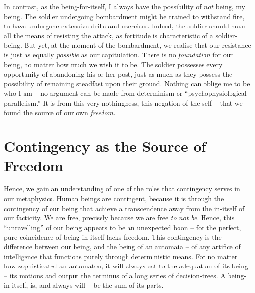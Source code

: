 In contrast, as the being-for-itself, I always have the possibility of \emph{not} being, my being. The soldier undergoing bombardment might be trained to withstand fire, to have undergone extensive drills and exercises. Indeed, the soldier should have all the means of resisting the attack, as fortitude is characteristic of a soldier-being. But yet, at the moment of the bombardment, we realise that our resistance is just as equally \emph{possible} as our capitulation. There is no \emph{foundation} for our being, no matter how much we wish it to be. The soldier possesses every opportunity of abandoning his or her post, just as much as they possess the possibility of remaining steadfast upon their ground.  Nothing can oblige me to be who I am -- no argument can be made from determinism or \enquote{psychophysiological parallelism.} It is from this very nothingness, this negation of the self -- that we found the source of our own \emph{freedom.} 


\section{Contingency as the Source of Freedom}

Hence, we gain an understanding of one of the roles that contingency serves in our metaphysics. Human beings are contingent, because it is through the contingency of our being that achieve a transcendence away from the in-itself of our facticity. We are free, precisely because we are free \emph{to not be}.  Hence, this \enquote{unravelling} of our being appears to be an unexpected boon -- for the perfect, pure coincidence of being-in-itself lacks freedom. This contingency is the difference between our being, and the being of an automata -- of any artifice of intelligence that functions purely through deterministic means. For no matter how sophisticated an automaton, it will always act to the adequation of its being -- its motions and output the terminus of a long series of decision-trees. A being-in-itself, is, and always will -- be the sum of its parts.

